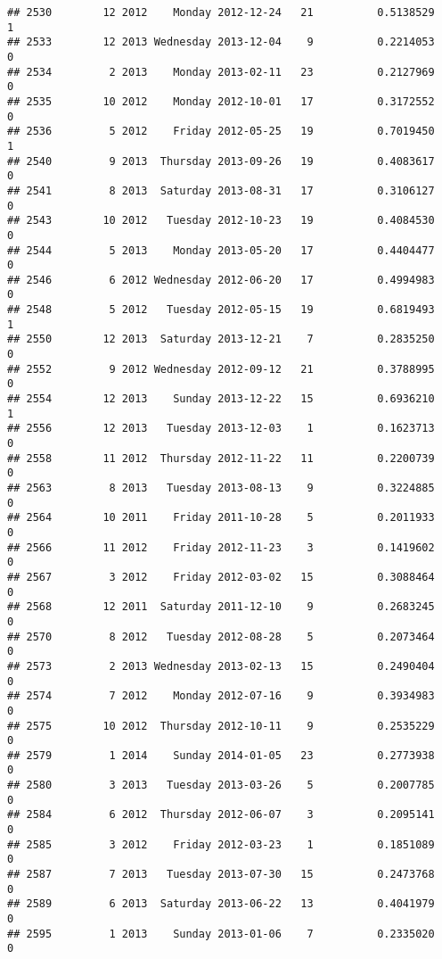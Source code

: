 \documentclass[
]{article}
\begin{document}
\begin{verbatim}
## 2530        12 2012    Monday 2012-12-24   21          0.5138529             1
## 2533        12 2013 Wednesday 2013-12-04    9          0.2214053             0
## 2534         2 2013    Monday 2013-02-11   23          0.2127969             0
## 2535        10 2012    Monday 2012-10-01   17          0.3172552             0
## 2536         5 2012    Friday 2012-05-25   19          0.7019450             1
## 2540         9 2013  Thursday 2013-09-26   19          0.4083617             0
## 2541         8 2013  Saturday 2013-08-31   17          0.3106127             0
## 2543        10 2012   Tuesday 2012-10-23   19          0.4084530             0
## 2544         5 2013    Monday 2013-05-20   17          0.4404477             0
## 2546         6 2012 Wednesday 2012-06-20   17          0.4994983             0
## 2548         5 2012   Tuesday 2012-05-15   19          0.6819493             1
## 2550        12 2013  Saturday 2013-12-21    7          0.2835250             0
## 2552         9 2012 Wednesday 2012-09-12   21          0.3788995             0
## 2554        12 2013    Sunday 2013-12-22   15          0.6936210             1
## 2556        12 2013   Tuesday 2013-12-03    1          0.1623713             0
## 2558        11 2012  Thursday 2012-11-22   11          0.2200739             0
## 2563         8 2013   Tuesday 2013-08-13    9          0.3224885             0
## 2564        10 2011    Friday 2011-10-28    5          0.2011933             0
## 2566        11 2012    Friday 2012-11-23    3          0.1419602             0
## 2567         3 2012    Friday 2012-03-02   15          0.3088464             0
## 2568        12 2011  Saturday 2011-12-10    9          0.2683245             0
## 2570         8 2012   Tuesday 2012-08-28    5          0.2073464             0
## 2573         2 2013 Wednesday 2013-02-13   15          0.2490404             0
## 2574         7 2012    Monday 2012-07-16    9          0.3934983             0
## 2575        10 2012  Thursday 2012-10-11    9          0.2535229             0
## 2579         1 2014    Sunday 2014-01-05   23          0.2773938             0
## 2580         3 2013   Tuesday 2013-03-26    5          0.2007785             0
## 2584         6 2012  Thursday 2012-06-07    3          0.2095141             0
## 2585         3 2012    Friday 2012-03-23    1          0.1851089             0
## 2587         7 2013   Tuesday 2013-07-30   15          0.2473768             0
## 2589         6 2013  Saturday 2013-06-22   13          0.4041979             0
## 2595         1 2013    Sunday 2013-01-06    7          0.2335020             0

\end{verbatim}
\end{document}
